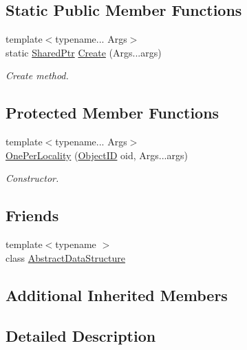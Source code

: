 \subsection*{Static Public Member Functions}
\begin{DoxyCompactItemize}
\item 
{\footnotesize template$<$typename... Args$>$ }\\static \hyperlink{classshad_1_1OnePerLocality_ad3a4f471e9d1fe8998bf783553c92d52}{Shared\-Ptr} \hyperlink{classshad_1_1OnePerLocality_a16468f8c57a89f3419d977d9753b063b}{Create} (Args...\-args)
\begin{DoxyCompactList}\small\item\em Create method. \end{DoxyCompactList}\end{DoxyCompactItemize}
\subsection*{Protected Member Functions}
\begin{DoxyCompactItemize}
\item 
{\footnotesize template$<$typename... Args$>$ }\\\hyperlink{classshad_1_1OnePerLocality_ac33d20c6dd46594471d463c62b624190}{One\-Per\-Locality} (\hyperlink{classshad_1_1OnePerLocality_a60e8354048763662cb04eaab1b063977}{Object\-I\-D} oid, Args...\-args)
\begin{DoxyCompactList}\small\item\em Constructor. \end{DoxyCompactList}\end{DoxyCompactItemize}
\subsection*{Friends}
\begin{DoxyCompactItemize}
\item 
{\footnotesize template$<$typename $>$ }\\class \hyperlink{classshad_1_1OnePerLocality_ab18afa4496cc863ddc11bab94b2adf57}{Abstract\-Data\-Structure}
\end{DoxyCompactItemize}
\subsection*{Additional Inherited Members}


\subsection{Detailed Description}

